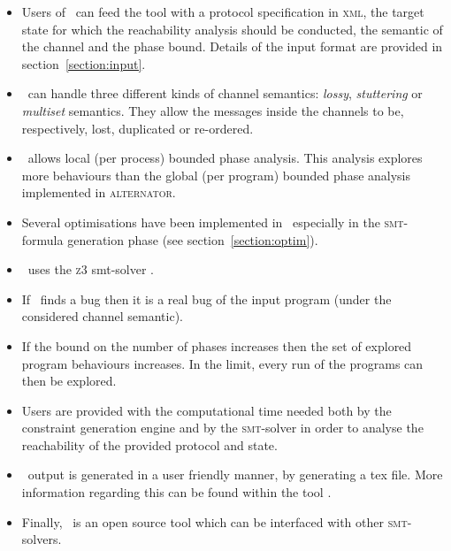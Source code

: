 \begin{itemize}
\item Users of \MPass\ can feed the tool with a protocol specification in \textsc{xml}, the target state for which the reachability analysis should be conducted, the semantic of the channel and the phase bound. Details of the input format are provided in section~\ref{section:input}.
%
\item \MPass\ can handle three different kinds of channel semantics: {\it lossy}, {\it stuttering} or {\it multiset} semantics.
They allow the messages inside the channels to be, respectively, lost, duplicated or re-ordered.
\item \MPass\ allows local (per process) bounded phase analysis.
This analysis explores more behaviours than the global (per program) bounded phase analysis implemented in \textsc{alternator}.
%
\item Several optimisations have been implemented in \MPass\, especially in the \textsc{smt}-formula generation phase (see section~\ref{section:optim}).
%
\item \MPass\ uses the \textsc{z3} {\sc smt}-solver \cite{z3}.
\item If \MPass\ finds a bug then it is a real bug of the input program (under the considered channel semantic).
%
\item If the bound on the number of phases increases then the set of explored program behaviours increases.
In the limit, every run of the programs can then be explored.
\item Users are provided with the computational time needed both by the constraint generation engine and by
  the \textsc{smt}-solver in order to analyse the reachability of the provided protocol and state.
%
\item \MPass\ output is generated in a user friendly manner, by generating a tex file.
More information regarding this can be found within the tool \cite{github.MPass}.
%
\item Finally, \MPass\ is an open source tool which can be interfaced with other \textsc{smt}-solvers.
\end{itemize}


